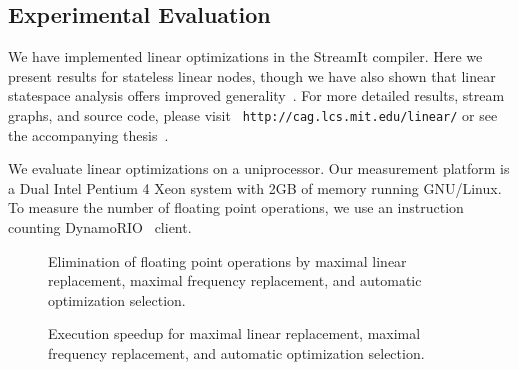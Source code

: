 \subsection*{Experimental Evaluation}


We have implemented linear optimizations in the StreamIt compiler.
Here we present results for stateless linear nodes, though we have
also shown that linear statespace analysis offers improved
generality~\cite{agrawal-cases05}.  For more detailed results,
stream graphs, and source code, please visit {\tt
http://cag.lcs.mit.edu/linear/} or see the accompanying
thesis~\cite{lamb-thesis}.

We evaluate linear optimizations on a uniprocessor.  Our measurement
platform is a Dual Intel Pentium 4 Xeon system with 2GB of memory
running GNU/Linux.  To measure the number of floating point
operations, we use an instruction counting DynamoRIO~\cite{dynamo99}
client.

\begin{figure}[t!]
\centering
{}
\caption[Elimination of floating point operations due to linear optimizations]{Elimination of floating point operations by maximal linear 
replacement, maximal frequency replacement, and automatic optimization
selection.}
\label{fig:flops}
\end{figure}

\begin{figure}[t!]
\centering
{}
\caption[Speedup due to linear optimizations]{Execution speedup for maximal linear replacement, maximal frequency 
replacement, and automatic optimization selection.}
\label{fig:execution-speedup}
\end{figure}

